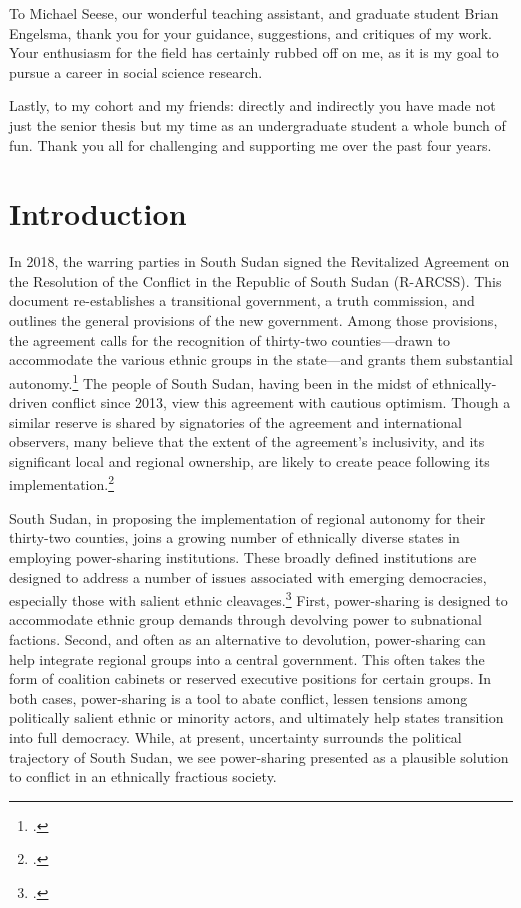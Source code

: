 \documentclass[12pt]{article}
\begin{document}
To Michael Seese, our wonderful teaching assistant, and graduate student Brian Engelsma, thank you for your guidance, suggestions, and critiques of my work. Your enthusiasm for the field has certainly rubbed off on me, as it is my goal to pursue a career in social science research. 

Lastly, to my cohort and my friends: directly and indirectly you have made not just the senior thesis but my time as an undergraduate student a whole bunch of fun. Thank you all for challenging and supporting me over the past four years.

\pagebreak


\doublespacing

\section{Introduction}
In 2018, the warring parties in South Sudan signed the Revitalized Agreement on the Resolution of the Conflict in the Republic of South Sudan (R-ARCSS). This document re-establishes a transitional government, a truth commission, and outlines the general provisions of the new government. Among those provisions, the agreement calls for the recognition of thirty-two counties---drawn to accommodate the various ethnic groups in the state---and grants them substantial autonomy.\footcite{intergovernmental_authority_on_development_agreement_2015, vhumbunu_reviving_2019} The people of South Sudan, having been in the midst of ethnically-driven conflict since 2013, view this agreement with cautious optimism. Though a similar reserve is shared by signatories of the agreement and international observers, many believe that the extent of the agreement's inclusivity, and its significant local and regional ownership, are likely to create peace following its implementation.\footcite{vhumbunu_reviving_2019, njoroge_status_2019} 

South Sudan, in proposing the implementation of regional autonomy for their thirty-two counties, joins a growing number of ethnically diverse states in employing power-sharing institutions. These broadly defined institutions are designed to address a number of issues associated with emerging democracies, especially those with salient ethnic cleavages.\footcite{horowitz_ethnic_1985, lijphart_consociational_1969, esman_management_1973, nordlinger_conflict_1972} First, power-sharing is designed to accommodate ethnic group demands through devolving power to subnational factions. Second, and often as an alternative to devolution, power-sharing can help integrate regional groups into a central government. This often takes the form of coalition cabinets or reserved executive positions for certain groups. In both cases, power-sharing is a tool to abate conflict, lessen tensions among politically salient ethnic or minority actors, and ultimately help states transition into full democracy. While, at present, uncertainty surrounds the political trajectory of South Sudan, we see power-sharing presented as a plausible solution to conflict in an ethnically fractious society. 
\end{document}
